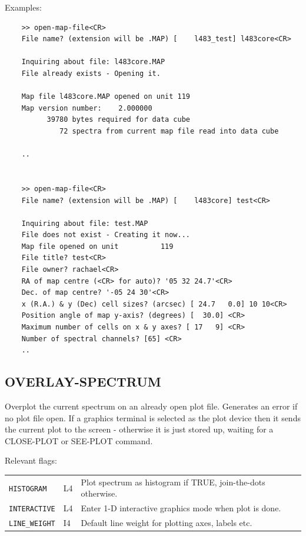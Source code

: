 \documentclass[11pt,twoside]{report}
\begin{document}
Examples:
\begin{verbatim}
    >> open-map-file<CR>
    File name? (extension will be .MAP) [    l483_test] l483core<CR>

    Inquiring about file: l483core.MAP
    File already exists - Opening it.

    Map file l483core.MAP opened on unit 119
    Map version number:    2.000000    
          39780 bytes required for data cube
             72 spectra from current map file read into data cube

    ..


    >> open-map-file<CR>
    File name? (extension will be .MAP) [    l483core] test<CR>
 
    Inquiring about file: test.MAP
    File does not exist - Creating it now...
    Map file opened on unit          119
    File title? test<CR>
    File owner? rachael<CR>
    RA of map centre (<CR> for auto)? '05 32 24.7'<CR>
    Dec. of map centre? '-05 24 30'<CR>
    x (R.A.) & y (Dec) cell sizes? (arcsec) [ 24.7   0.0] 10 10<CR>
    Position angle of map y-axis? (degrees) [  30.0] <CR>
    Maximum number of cells on x & y axes? [ 17   9] <CR>
    Number of spectral channels? [65] <CR>
    ..
\end{verbatim}

\subsection{OVERLAY-SPECTRUM} 

Overplot the current spectrum on an already open plot file. Generates an
error if no plot file open. If a graphics terminal is selected as the
plot device then it sends the current plot to the screen - otherwise it
is just stored up, waiting for a CLOSE-PLOT or SEE-PLOT command.

Relevant flags:\\
\begin{tabular}{lll}
  \verb+HISTOGRAM+   & L4 & Plot spectrum as histogram if TRUE,
                            join-the-dots otherwise.\\
  \verb+INTERACTIVE+ & L4 & Enter 1-D interactive graphics mode when 
                            plot is done.\\
  \verb+LINE_WEIGHT+ & I4 & Default line weight for plotting axes,
                            labels etc.
\end{tabular}
\end{document}
